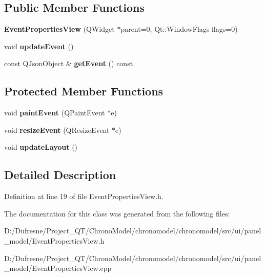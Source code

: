 \subsection*{Public Member Functions}
\begin{DoxyCompactItemize}
\item 
\hypertarget{class_event_properties_view_a97b5d41ff6e7719033f3b69384abb516}{{\bfseries Event\-Properties\-View} (Q\-Widget $\ast$parent=0, Qt\-::\-Window\-Flags flags=0)}\label{class_event_properties_view_a97b5d41ff6e7719033f3b69384abb516}

\item 
\hypertarget{class_event_properties_view_a962d4007a1787d1816c95535580ad7c2}{void {\bfseries update\-Event} ()}\label{class_event_properties_view_a962d4007a1787d1816c95535580ad7c2}

\item 
\hypertarget{class_event_properties_view_a193610a0c4a84a5f80fcad095856f43a}{const Q\-Json\-Object \& {\bfseries get\-Event} () const }\label{class_event_properties_view_a193610a0c4a84a5f80fcad095856f43a}

\end{DoxyCompactItemize}
\subsection*{Protected Member Functions}
\begin{DoxyCompactItemize}
\item 
\hypertarget{class_event_properties_view_ab916c48fb88a71fd1f019a92e5dfce19}{void {\bfseries paint\-Event} (Q\-Paint\-Event $\ast$e)}\label{class_event_properties_view_ab916c48fb88a71fd1f019a92e5dfce19}

\item 
\hypertarget{class_event_properties_view_a39a8d865783e0784e2acee57fe61fb21}{void {\bfseries resize\-Event} (Q\-Resize\-Event $\ast$e)}\label{class_event_properties_view_a39a8d865783e0784e2acee57fe61fb21}

\item 
\hypertarget{class_event_properties_view_a1d37d041063c4174d04b4826c97a8da8}{void {\bfseries update\-Layout} ()}\label{class_event_properties_view_a1d37d041063c4174d04b4826c97a8da8}

\end{DoxyCompactItemize}


\subsection{Detailed Description}


Definition at line 19 of file Event\-Properties\-View.\-h.



The documentation for this class was generated from the following files\-:\begin{DoxyCompactItemize}
\item 
D\-:/\-Dufresne/\-Project\-\_\-\-Q\-T/\-Chrono\-Model/chronomodel/chronomodel/src/ui/panel\-\_\-model/Event\-Properties\-View.\-h\item 
D\-:/\-Dufresne/\-Project\-\_\-\-Q\-T/\-Chrono\-Model/chronomodel/chronomodel/src/ui/panel\-\_\-model/Event\-Properties\-View.\-cpp\end{DoxyCompactItemize}
